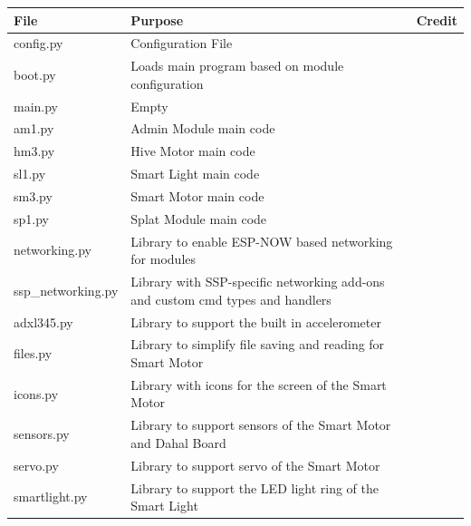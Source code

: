\begin{table}[H]
    \centering
    \begin{tabular}{|l|p{180pt}|l|}
        \hline
        \textbf{File} & \textbf{Purpose} & \textbf{Credit} \\
        \hline\hline
        config.py & Configuration File & \citet{triebold_smart_2025} \\
        \hline
        boot.py & Loads main program based on module configuration & \citet{triebold_smart_2025} \\
        \hline
        main.py & Empty &  \\
        \hline\hline
        am1.py & Admin Module main code & \citet{triebold_smart_2025} \\
        \hline
        hm3.py & Hive Motor main code & \citet{triebold_smart_2025} \\
        \hline
        sl1.py & Smart Light main code & \citet[]{dahal_smart_2025} \\
        \hline
        sm3.py & Smart Motor main code & \citet[]{dahal_smart_2025} \\
        \hline
        sp1.py & Splat Module main code & \citet{triebold_smart_2025} \\
        \hline\hline
        networking.py & Library to enable ESP-NOW based networking for modules & \citet{triebold_smart_2025} \\
        \hline
        ssp\_networking.py & Library with SSP-specific networking add-ons and custom cmd types and handlers & \citet{triebold_smart_2025} \\
        \hline\hline
        adxl345.py & Library to support the built in accelerometer & \citet[]{nanawangdfr_micropython_nodate}\\
        \hline
        files.py & Library to simplify file saving and reading for Smart Motor & \citet[]{dahal_smart_2025} \\
        \hline
        icons.py & Library with icons for the screen of the Smart Motor & \citet[]{dahal_designing_2024} \\
        \hline
        sensors.py & Library to support sensors of the Smart Motor and Dahal Board & \citet[]{dahal_smart_2025} \\
        \hline
        servo.py & Library to support servo of the Smart Motor & \citet[]{dahal_smart_2025} \\
        \hline
        smartlight.py & Library to support the LED light ring of the Smart Light & \citet[]{dahal_smart_2025} \\

\end{tabular}
\end{table}
